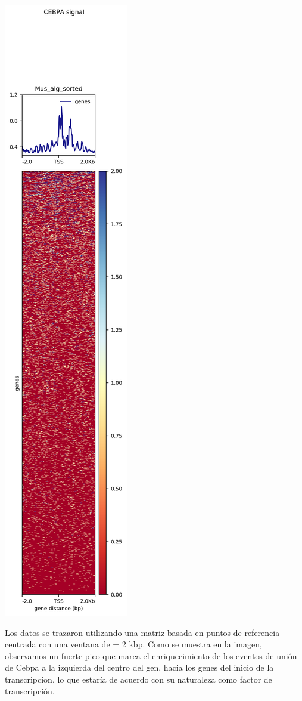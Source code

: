 \documentclass[
]{article}
\begin{document}
\includegraphics{./T04_images/CEBPA_genes2.png}

Los datos se trazaron utilizando una matriz basada en puntos de
referencia centrada con una ventana de ± 2 kbp. Como se muestra en la
imagen, observamos un fuerte pico que marca el enriquecimiento de los
eventos de unión de Cebpa a la izquierda del centro del gen, hacia los
genes del inicio de la transcripcion, lo que estaría de acuerdo con su
naturaleza como factor de transcripción.
\end{document}
